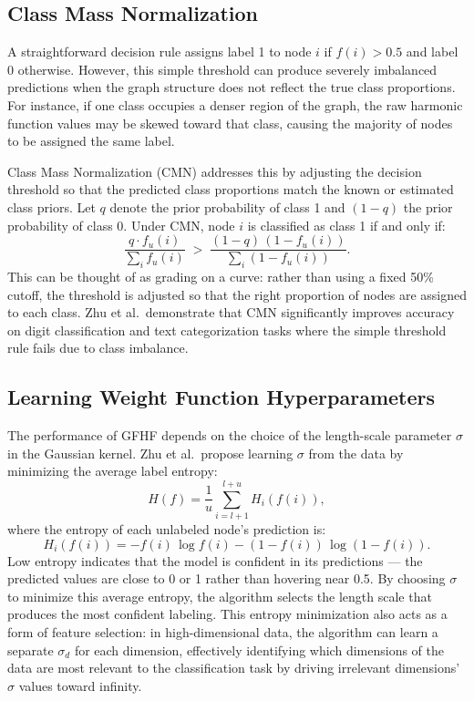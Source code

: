 \documentclass{article}
\begin{document}
\subsection{Class Mass Normalization}

A straightforward decision rule assigns label 1 to node $i$ if $f(i) > 0.5$ and label 0 otherwise. However, this simple threshold can produce severely imbalanced predictions when the graph structure does not reflect the true class proportions. For instance, if one class occupies a denser region of the graph, the raw harmonic function values may be skewed toward that class, causing the majority of nodes to be assigned the same label.

Class Mass Normalization (CMN) addresses this by adjusting the decision threshold so that the predicted class proportions match the known or estimated class priors. Let $q$ denote the prior probability of class 1 and $(1-q)$ the prior probability of class 0. Under CMN, node $i$ is classified as class 1 if and only if:
\[
\frac{q \cdot f_u(i)}{\sum_{i} f_u(i)}
\;>\;
\frac{(1-q)\,(1 - f_u(i))}{\sum_{i} (1 - f_u(i))}.
\]
This can be thought of as grading on a curve: rather than using a fixed 50\% cutoff, the threshold is adjusted so that the right proportion of nodes are assigned to each class. Zhu et al.\ demonstrate that CMN significantly improves accuracy on digit classification and text categorization tasks where the simple threshold rule fails due to class imbalance.

\subsection{Learning Weight Function Hyperparameters}

The performance of GFHF depends on the choice of the length-scale parameter $\sigma$ in the Gaussian kernel. Zhu et al.\ propose learning $\sigma$ from the data by minimizing the average label entropy:
\[
H(f) = \frac{1}{u}\sum_{i=l+1}^{l+u} H_i(f(i)),
\]
where the entropy of each unlabeled node's prediction is:
\[
H_i(f(i)) = -f(i)\,\log f(i) - (1-f(i))\,\log(1-f(i)).
\]
Low entropy indicates that the model is confident in its predictions --- the predicted values are close to 0 or 1 rather than hovering near 0.5. By choosing $\sigma$ to minimize this average entropy, the algorithm selects the length scale that produces the most confident labeling. This entropy minimization also acts as a form of feature selection: in high-dimensional data, the algorithm can learn a separate $\sigma_d$ for each dimension, effectively identifying which dimensions of the data are most relevant to the classification task by driving irrelevant dimensions' $\sigma$ values toward infinity.
\end{document}
